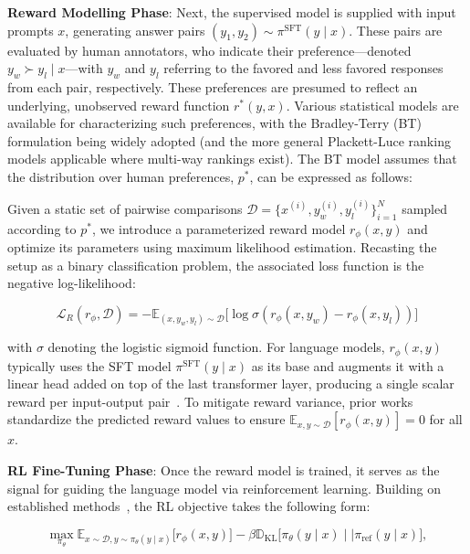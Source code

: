 \textbf{Reward Modelling Phase}: Next, the supervised model is supplied with input prompts $x$, generating answer pairs $(y_1, y_2)\sim \pi^\text{SFT}(y \mid x)$. These pairs are evaluated by human annotators, who indicate their preference—denoted $y_w\succ y_l \mid x$—with $y_w$ and $y_l$ referring to the favored and less favored responses from each pair, respectively. These preferences are presumed to reflect an underlying, unobserved reward function $r^*(y, x)$. Various statistical models are available for characterizing such preferences, with the Bradley-Terry (BT) \cite{bradley1952rankanalysis} formulation being widely adopted (and the more general Plackett-Luce ranking models \citep{plackett1975analysis, luce2012individual} applicable where multi-way rankings exist). The BT model assumes that the distribution over human preferences, $p^*$, can be expressed as follows:

Given a static set of pairwise comparisons $\mathcal{D}=\bigl\{x^{(i)}, y_w^{(i)}, y_l^{(i)}\bigr\}_{i=1}^N$ sampled according to $p^*$, we introduce a parameterized reward model $r_{\phi}(x, y)$ and optimize its parameters using maximum likelihood estimation. Recasting the setup as a binary classification problem, the associated loss function is the negative log-likelihood:

\begin{equation}\label{eq:reward_model}
    \mathcal{L}_R(r_{\phi}, \mathcal{D}) = -\mathbb{E}_{(x, y_w, y_l)\sim \mathcal{D}}\bigl[\log \sigma(r_{\phi}(x, y_w)- r_{\phi}(x, y_l))\bigr]
\end{equation}

with $\sigma$ denoting the logistic sigmoid function. For language models, $r_{\phi}(x, y)$ typically uses the SFT model $\pi^\text{SFT}(y \mid x)$ as its base and augments it with a linear head added on top of the last transformer layer, producing a single scalar reward per input-output pair~\cite{ziegler2020finetuning}. To mitigate reward variance, prior works standardize the predicted reward values to ensure $\mathbb{E}_{x,y\sim \mathcal{D}}\left[r_\phi(x, y)\right] = 0$ for all $x$.

\textbf{RL Fine-Tuning Phase}: Once the reward model is trained, it serves as the signal for guiding the language model via reinforcement learning. Building on established methods~\citep{jaques2017sequence, jaques2020human}, the RL objective takes the following form:

\begin{equation}\label{eq:RL}
\max_{\pi_{\theta}}  \mathbb{E}_{x\sim \mathcal{D}, y\sim \pi_{\theta}(y \mid x)}\bigl[r_{\phi}(x, y)\bigr] - \beta\mathbb{D}_{\textrm{KL}}\bigl[\pi_{\theta}(y\mid x)\mid \mid \pi_\text{ref}(y\mid x)\bigr],
\end{equation}

